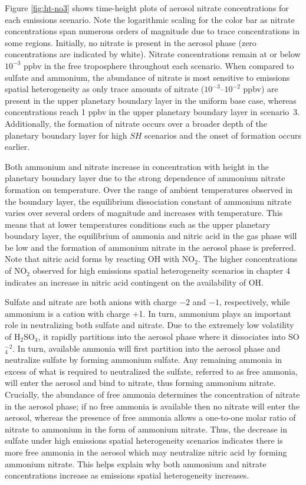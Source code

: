 Figure \ref{fig:ht-no3} shows time-height plots of aerosol nitrate concentrations for each emissions scenario. Note the logarithmic scaling for the color bar as nitrate concentrations span numerous orders of magnitude due to trace concentrations in some regions. Initially, no nitrate is present in the aerosol phase (zero concentrations are indicated by white). Nitrate concentrations remain at or below $10^{-3}$ ppbv in the free troposphere throughout each scenario. When compared to sulfate and ammonium, the abundance of nitrate is most sensitive to emissions spatial heterogeneity as only trace amounts of nitrate ($10^{-3}$--$10^{-2}$ ppbv) are present in the upper planetary boundary layer in the uniform base case, whereas concentrations reach 1 ppbv in the upper planetary boundary layer in scenario~3. Additionally, the formation of nitrate occurs over a broader depth of the planetary boundary layer for high $SH$ scenarios and the onset of formation occurs earlier.

Both ammonium and nitrate increase in concentration with height in the planetary boundary layer due to the strong dependence of ammonium nitrate formation on temperature. Over the range of ambient temperatures observed in the boundary layer, the equilibrium dissociation constant of ammonium nitrate varies over several orders of magnitude and increases with temperature. This means that at lower temperatures conditions such as the upper planetary boundary layer, the equilibrium of ammonia and nitric acid in the gas phase will be low and the formation of ammonium nitrate in the aerosol phase is preferred. Note that nitric acid forms by reacting OH with NO$_2$. The higher concentrations of NO$_2$ observed for high emissions spatial heterogeneity scenarios in chapter 4 indicates an increase in nitric acid contingent on the availability of OH. 

Sulfate and nitrate are both anions with charge $-2$ and $-1$, respectively, while ammonium is a cation with charge +1. In turn, ammonium plays an important role in neutralizing both sulfate and nitrate. Due to the extremely low volatility of H$_2$SO$_4$, it rapidly partitions into the aerosol phase where it dissociates into SO$_4^{-2}$. In turn, available ammonia will first partition into the aerosol phase and neutralize sulfate by forming ammonium sulfate. Any remaining ammonia in excess of what is required to neutralized the sulfate, referred to as free ammonia, will enter the aerosol and bind to nitrate, thus forming ammonium nitrate. Crucially, the abundance of free ammonia determines the concentration of nitrate in the aerosol phase; if no free ammonia is available then no nitrate will enter the aerosol, whereas the presence of free ammonia allows a one-to-one molar ratio of nitrate to ammonium in the form of ammonium nitrate. Thus, the decrease in sulfate under high emissions spatial heterogeneity scenarios indicates there is more free ammonia in the aerosol which may neutralize nitric acid by forming ammonium nitrate. This helps explain why both ammonium and nitrate concentrations increase as emissions spatial heterogeneity increases. 

